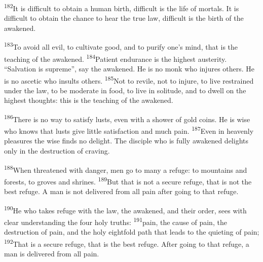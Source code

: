 \documentclass[openany,12pt,english]{book}
\newenvironment{para}{\par\pretolerance=100\tolerance=200\setlength{\emergencystretch}{0.6em}\relax}{\par}
\begin{document}
\begin{para}
    \textsuperscript{182}\thinspace{}It is dif\-fi\-cult to ob\-tain a hu\-man birth, dif\-fi\-cult is the life of mortals. It is dif\-fi\-cult to ob\-tain the chance to hear the true law, dif\-fi\-cult is the birth of the awakened.
\end{para}

\begin{para}
    \textsuperscript{183}\thinspace{}To a\-void all evil, to cul\-ti\-vate good, and to pu\-ri\-fy one's mind, that is the teach\-ing of the awakened.
    \textsuperscript{184}\thinspace{}Pa\-tient en\-dur\-ance is the highest aus\-ter\-i\-ty. “Sal\-va\-tion is su\-preme”, say the awakened. He is no monk who injures others. He is no as\-cet\-ic who insults others.
    \textsuperscript{185}\thinspace{}Not to re\-vile, not to in\-jure, to live restrained un\-der the law, to be mod\-er\-ate in food, to live in sol\-i\-tude, and to dwell on the highest thoughts: this is the teach\-ing of the awakened.
\end{para}

\begin{para}
    \textsuperscript{186}\thinspace{}There is no way to sat\-is\-fy lusts, e\-ven with a show\-er of gold coins. He is wise who knows that lusts give lit\-tle sat\-is\-fac\-tion and much pain.
    \textsuperscript{187}\thinspace{}E\-ven in heav\-en\-ly pleasures the wise finds no de\-light. The dis\-ci\-ple who is ful\-ly awakened delights on\-ly in the de\-struc\-tion of crav\-ing.
\end{para}

\begin{para}
    \textsuperscript{188}\thinspace{}When threatened with dan\-ger, men go to man\-y a ref\-uge: to mountains and forests, to groves and shrines.
    \textsuperscript{189}\thinspace{}But that is not a se\-cure ref\-uge, that is not the best ref\-uge. A man is not delivered from all pain af\-ter go\-ing to that ref\-uge.
\end{para}

\begin{para}
    \textsuperscript{190}\thinspace{}He who takes ref\-uge with the law, the awakened, and their or\-der, sees with clear un\-der\-stand\-ing the four ho\-ly truths:
    \textsuperscript{191}\thinspace{}pain, the cause of pain, the de\-struc\-tion of pain, and the ho\-ly eight\-fold path that leads to the quieting of pain;
    \textsuperscript{192}\thinspace{}That is a se\-cure ref\-uge, that is the best ref\-uge. Af\-ter go\-ing to that ref\-uge, a man is delivered from all pain.
\end{para}
\end{document}
